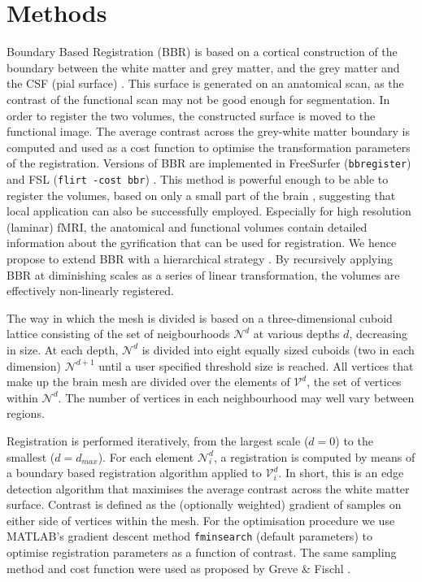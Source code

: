 \section*{Methods}
Boundary Based Registration (BBR) is based on a cortical construction of the boundary between the white matter and grey matter, and the grey matter and the CSF (pial surface) \citep{Greve2009}. This surface is generated on an anatomical scan, as the contrast of the functional scan may not be good enough for segmentation. In order to register the two volumes, the constructed surface is moved to the functional image. The average contrast across the grey-white matter boundary is computed and used as a cost function to optimise the transformation parameters of the registration. Versions of BBR are implemented in FreeSurfer (\texttt{bbregister}) \citep{Dale1999} and FSL (\texttt{flirt -cost bbr}) \citep{Jenkinson2001}. This method is powerful enough to be able to register the volumes, based on only a small part of the brain \citep{Greve2009}, suggesting that local application can also be successfully employed. Especially for high resolution (laminar) fMRI, the anatomical and functional volumes contain detailed information about the gyrification that can be used for registration. We hence propose to extend BBR with a hierarchical strategy \citep{Collins1995}. By recursively applying BBR at diminishing scales as a series of linear transformation, the volumes are effectively non-linearly registered.

The way in which the mesh is divided is based on a three-dimensional cuboid lattice consisting of the set of neigbourhoods $\mathcal{N}^{d}$ at various depths $d$, decreasing in size. At each depth, $\mathcal{N}^{d}$ is divided into eight equally sized cuboids (two in each dimension) $\mathcal{N}^{d + 1}$ until a user specified threshold size is reached. All vertices that make up the brain mesh are divided over the elements of $\mathcal{V}^{d}$, the set of vertices within $\mathcal{N}^{d}$. The number of vertices in each neighbourhood may well vary between regions.

Registration is performed iteratively, from the largest scale ($d=0$) to the smallest ($d=d_{max}$). For each element $\mathcal{N}_{i}^{d}$, a registration is computed by means of a boundary based registration algorithm \citep{Greve2009} applied to $\mathcal{V}_{i}^{d}$. In short, this is an edge detection algorithm that maximises the average contrast across the white matter surface. Contrast is defined as the (optionally weighted) gradient of samples on either side of vertices within the mesh. For the optimisation procedure we use MATLAB's gradient descent method \texttt{fminsearch} (default parameters) to optimise registration parameters as a function of contrast. The same sampling method and cost function were used as proposed by Greve \& Fischl \citep{Greve2009}.

